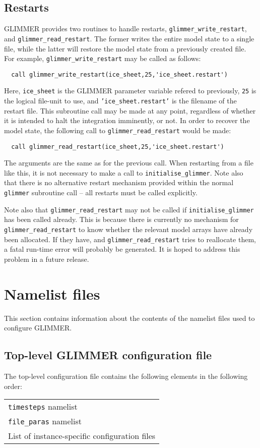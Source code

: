 \documentclass[11pt]{article}
\begin{document}
\subsection{Restarts}
%
GLIMMER provides two routines to handle restarts,
\texttt{glimmer\_write\_restart}, and \texttt{glimmer\_read\_restart}. The
former writes the entire model state to a single file, while the latter will
restore the model state from a previously created
file. For example, \texttt{glimmer\_write\_restart} may be called as follows:
%
\begin{verbatim}
  call glimmer_write_restart(ice_sheet,25,'ice_sheet.restart')
\end{verbatim}
%
Here, \texttt{ice\_sheet} is the GLIMMER parameter variable refered to
previously, \texttt{25} is the logical file-unit to use, and
\texttt{'ice\_sheet.restart'} is the filename of the restart file. This
subroutine call may be made at any point, regardless of whether it is intended
to halt the integration imminently, or not. In order to recover the model
state, the following call to \texttt{glimmer\_read\_restart} would be made:
%
\begin{verbatim}
  call glimmer_read_restart(ice_sheet,25,'ice_sheet.restart')
\end{verbatim}
%
The arguments are the same as for the previous call. When restarting from a
file like this, it is not necessary to make a call to
\texttt{initialise\_glimmer}. Note also that there is no alternative restart mechanism
provided within the normal \texttt{glimmer} subroutine call -- all restarts
must be called explicitly.

Note also that \texttt{glimmer\_read\_restart} may not be called if
\texttt{initialise\_glimmer} has been called already. This is because there is
currently no mechanism for \texttt{glimmer\_read\_restart} to know whether the
relevant model arrays have already been allocated. If they have, and
\texttt{glimmer\_read\_restart} tries to reallocate them, a fatal
run-time error will probably be generated. It is hoped to address this problem
in a future release.
%
\section{Namelist files}
%
This section contains information about the contents of the namelist files
used to configure GLIMMER.
%
\subsection{Top-level GLIMMER configuration file}
%
The top-level configuration file contains the following elements in the
following order:
\begin{center}
\begin{tabular}{l}
\texttt{timesteps} namelist \\
\texttt{file\_paras} namelist \\
List of instance-specific configuration files \\
\end{tabular}
\end{center}
%
\end{document}
